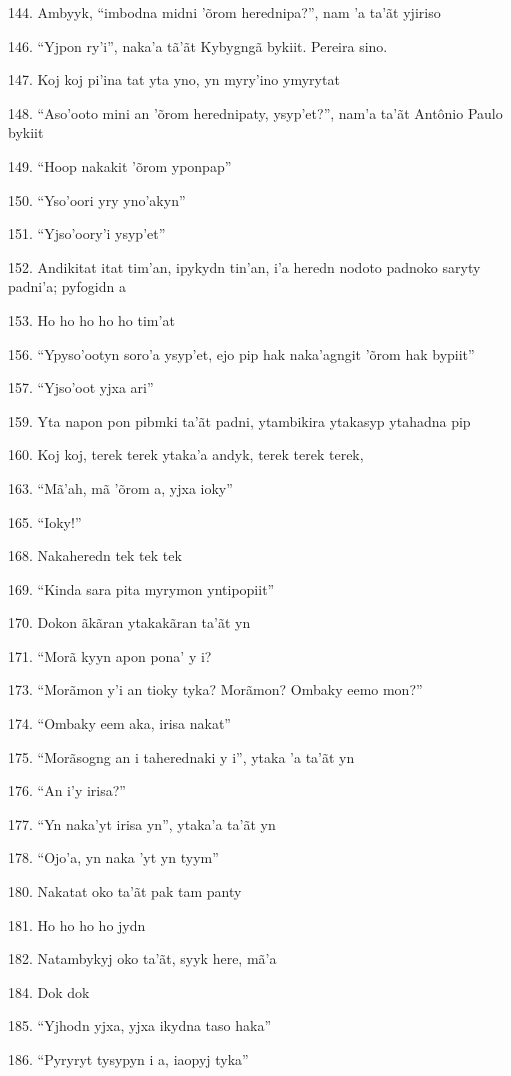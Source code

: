 144. Ambyyk, ``imbodna midni 'õrom herednipa?'', nam 'a ta'ãt yjiriso

146. ``Yjpon ry'i'', naka'a tã'ãt Kybygngã bykiit. Pereira sino.

147. Koj koj pi'ina tat yta yno, yn myry'ino ymyrytat

148. ``Aso'ooto mini an 'õrom herednipaty, ysyp'et?'', nam'a ta'ãt
Antônio Paulo bykiit

149. ``Hoop nakakit 'õrom yponpap''

150. ``Yso'oori yry yno'akyn''

151. ``Yjso'oory'i ysyp'et''

152. Andikitat itat tim'an, ipykydn tin'an, i'a heredn nodoto padnoko
saryty padni'a; pyfogidn a

153. Ho ho ho ho ho tim'at

156. ``Ypyso'ootyn soro'a ysyp'et, ejo pip hak naka'agngit 'õrom hak
bypiit''

157. ``Yjso'oot yjxa ari''

159. Yta napon pon pibmki ta'ãt padni, ytambikira ytakasyp ytahadna pip

160. Koj koj, terek terek ytaka'a andyk, terek terek terek,

163. ``Mã'ah, mã 'õrom a, yjxa ioky''

165. ``Ioky!''

168. Nakaheredn tek tek tek

169. ``Kinda sara pita myrymon yntipopiit''

170. Dokon ãkãran ytakakãran ta'ãt yn

171. ``Morã kyyn apon pona' y i?

173. ``Morãmon y'i an tioky tyka? Morãmon? Ombaky eemo mon?''

174. ``Ombaky eem aka, irisa nakat''

175. ``Morãsogng an i taherednaki y i'', ytaka 'a ta'ãt yn

176. ``An i'y irisa?''

177. ``Yn naka'yt irisa yn'', ytaka'a ta'ãt yn

178. ``Ojo'a, yn naka 'yt yn tyym''

180. Nakatat oko ta'ãt pak tam panty

181. Ho ho ho ho jydn

182. Natambykyj oko ta'ãt, syyk here, mã'a

184. Dok dok

185. ``Yjhodn yjxa, yjxa ikydna taso haka''

186. ``Pyryryt tysypyn i a, iaopyj tyka''

